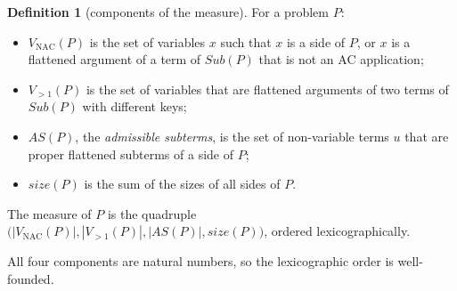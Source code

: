 \documentclass[11pt,a4paper]{article}
\theoremstyle{definition}
\newtheorem{definition}[theorem]{Definition}
\theoremstyle{remark}
\newcommand{\Sub}{\mathit{Sub}}
\newcommand{\VNAC}{V_{\mathrm{NAC}}}
\newcommand{\Vtwo}{V_{>1}}
\newcommand{\AS}{\mathit{AS}}
\newcommand{\psize}{\mathit{size}}
\begin{document}
\begin{definition}[components of the measure]
  For a problem $P$:
  \begin{itemize}[nosep]
    \item $\VNAC(P)$ is the set of variables $x$ such that $x$ is a side of $P$, or $x$ is a
          flattened argument of a term of $\Sub(P)$ that is not an AC application;
    \item $\Vtwo(P)$ is the set of variables that are flattened arguments of two terms of
          $\Sub(P)$ with different keys;
    \item $\AS(P)$, the \emph{admissible subterms}, is the set of non-variable terms $u$ that are
          proper flattened subterms of a side of $P$;
    \item $\psize(P)$ is the sum of the sizes of all sides of $P$.
  \end{itemize}
  The measure of $P$ is the quadruple
  $\bigl(|\VNAC(P)|, |\Vtwo(P)|, |\AS(P)|, \psize(P)\bigr)$, ordered lexicographically.
\end{definition}

All four components are natural numbers, so the lexicographic order is well-founded.
\end{document}
